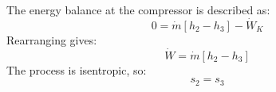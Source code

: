The energy balance at the compressor is described as:  
\[
0 = \dot{m} \left[ h_2 - h_3 \right] - \dot{W}_K
\]  
Rearranging gives:  
\[
\dot{W} = \dot{m} \left[ h_2 - h_3 \right]
\]  
The process is isentropic, so:  
\[
s_2 = s_3
\]